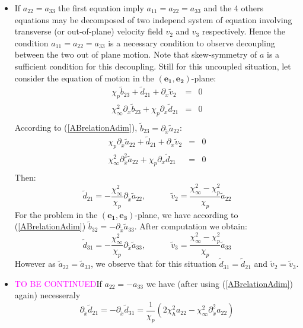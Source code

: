 \documentclass[
10pt, %
a4paper, %
oneside, %
headinclude,footinclude, %
table
]{scrartcl}
\begin{document}
\begin{itemize}
\item If $a_{22}=a_{33}$ the first equation imply $a_{11}=a_{22}=a_{33}$ and the 4 others equations may be decomposed of two independ system of equation involving transverse (or out-of-plane) velocity field $v_{2}$ and $v_{3}$ respectively. Hence the condition $a_{11}=a_{22}=a_{33}$ is a necessary condition to observe decoupling between the two out of plane motion. Note that  skew-symmetry of $a$ is a sufficient condition for this decoupling. Still for this uncoupled situation, let consider the equation of motion in the $(\boldsymbol{e_{1}},\boldsymbol{e_{2}})$-plane:
$$
\begin{array}{rcl}
 \chi_p \tilde{b}_{23}+\tilde{d}_{21}+\partial_{x}\tilde{v}_2&=&0 \\
\chi _{\infty }^2\partial_{x}\tilde{b}_{23}+\chi _p \partial_{x}\tilde{d}_{21} &=&0\\[8pt]
\end{array}
$$
According to (\ref{ABrelationAdim}), $\tilde{b}_{23}= \partial_{\tilde{x}}\tilde{a}_{22}$:
$$
\begin{array}{rcl}
 \chi_p\partial_{\tilde{x}}\tilde{a}_{22}+\tilde{d}_{21}+\partial_{x}\tilde{v}_2&=&0 \\
\chi _{\infty }^2\partial_{\tilde{x}}^2\tilde{a}_{22}+\chi _p \partial_{x}\tilde{d}_{21} &=&0\\[8pt]
\end{array}
$$
Then:
$$
\tilde{d}_{21}=-\frac{\chi _{\infty }^2}{\chi _p}\partial_{\tilde{x}}\tilde{a}_{22},
\quad\quad\quad
\tilde{v}_2 =\frac{\chi _{\infty}^2-\chi _p^2}{\chi _p}\tilde{a}_{22}
$$
For the problem in the $(\boldsymbol{e_{1}},\boldsymbol{e_{3}})$-plane, we have according to (\ref{ABrelationAdim}) $\tilde{b}_{32}=- \partial_{\tilde{x}}\tilde{a}_{33}$. After computation we obtain:
$$
\tilde{d}_{31}=-\frac{\chi _{\infty }^2}{\chi _p}\partial_{\tilde{x}}\tilde{a}_{33},
\quad\quad\quad
\tilde{v}_3 =\frac{\chi _{\infty}^2-\chi _p^2}{\chi _p}\tilde{a}_{33}
$$
However as $\tilde{a}_{22}=\tilde{a}_{33}$, we observe that for this situation $\tilde{d}_{31}=\tilde{d}_{21}$ and $\tilde{v}_2=\tilde{v}_3$.
\item \textcolor{magenta}{TO BE CONTINUED}If $a_{22}=-a_{33}$ we have (after using (\ref{ABrelationAdim}) again) necesseraly
$$
\partial_{\tilde{x}}\tilde{d}_{21}=-\partial_{\tilde{x}}\tilde{d}_{31}=\frac{1}{\chi_{p}}\left( 2\chi_{h}^2a_{22}-\chi_{\infty}^2\partial_{\tilde{x}}^2a_{22}\right)
$$ 
\end{itemize}
\end{document}
